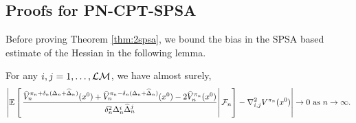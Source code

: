 \subsection{Proofs for PN-CPT-SPSA}
\label{appendix:2spsa}

Before proving Theorem \ref{thm:2spsa}, we bound the bias in the SPSA based estimate of the Hessian in the following lemma.
\begin{lemma}
\label{lemma:2spsa-bias}
For any $i, j= 1,\ldots,\mathcal{L}\mathcal{M}$, we have almost surely,  
\begin{align}
    \left| \mathbb{E}\left[\left.\dfrac{\widehat V_n^{\pi_n+\delta_n(\Delta_n+\widehat\Delta_n)}(x^0) + \widehat V_n^{\pi_n-\delta_n(\Delta_n+\widehat\Delta_n)}(x^0) - 2 \widehat V_n^{\pi_n}(x^0)}{\delta_n^2 \Delta_n^{i}\widehat\Delta_n^j}\right| \mathcal{F}_n \right] - \nabla^2_{i,j} V^{\pi_n}(x^0) \right| \rightarrow 0 \text{ as } n\rightarrow\infty.
\end{align} 
\end{lemma}
